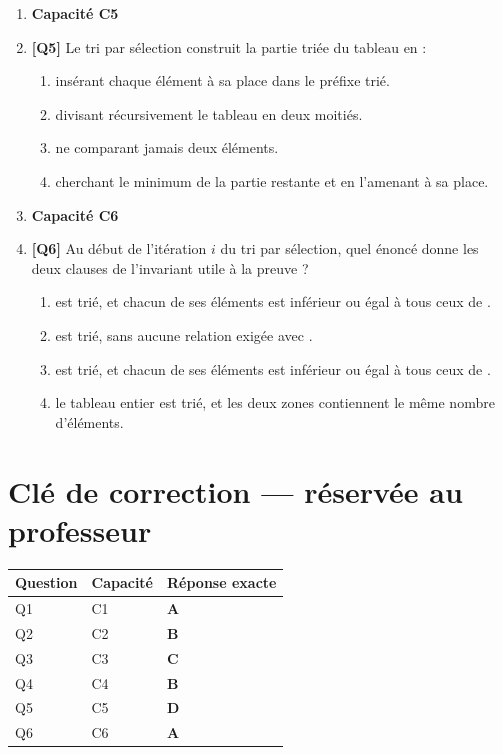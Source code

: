 \begin{enumerate}
\item[] \textbf{Capacité C5}

\item \textbf{[Q5]} Le tri par sélection construit la partie triée du tableau en :
  \begin{enumerate}[label=\Alph*.]
    \item insérant chaque élément à sa place dans le préfixe trié.
    \item divisant récursivement le tableau en deux moitiés.
    \item ne comparant jamais deux éléments.
    \item cherchant le minimum de la partie restante et en l'amenant à sa place.
  \end{enumerate}

\item[] \textbf{Capacité C6}

\item \textbf{[Q6]} Au début de l'itération $i$ du tri par sélection, quel énoncé donne les deux clauses de l'invariant utile à la preuve ?
  \begin{enumerate}[label=\Alph*.]
    \item {} est trié, et chacun de ses éléments est inférieur ou égal à tous ceux de .
    \item {} est trié, sans aucune relation exigée avec .
    \item {} est trié, et chacun de ses éléments est inférieur ou égal à tous ceux de .
    \item le tableau entier est trié, et les deux zones contiennent le même nombre d'éléments.
  \end{enumerate}

\end{enumerate}

\ifnxVersionProfesseur
\clearpage
\section*{Clé de correction — réservée au professeur}

\begin{center}
\begin{tabular}{lll}
\hline
Question & Capacité & Réponse exacte \\
\hline
Q1 & C1 & \textbf{A} \\
Q2 & C2 & \textbf{B} \\
Q3 & C3 & \textbf{C} \\
Q4 & C4 & \textbf{B} \\
Q5 & C5 & \textbf{D} \\
Q6 & C6 & \textbf{A} \\
\hline
\end{tabular}
\end{center}


